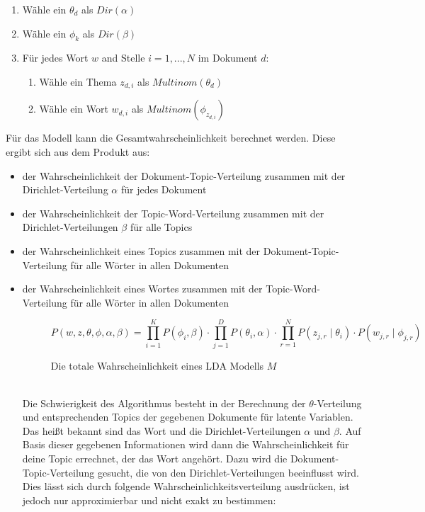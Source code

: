 \documentclass[german,version-2020-11]{uzl-thesis}
\begin{document}
\begin{enumerate}
	\item Wähle ein $\theta_d$ als $Dir(\alpha)$
	\item Wähle ein $\phi_k$ als $Dir(\beta)$
	\item Für jedes Wort $w$ and Stelle $i = 1,...,N$ im Dokument $d$: 
	\begin{enumerate}
		\item Wähle ein Thema $z_{d,i}$ als $Multinom(\theta_d)$
		\item Wähle ein Wort $w_{d,i}$ als $Multinom(\phi_z_{d,i})$
	\end{enumerate}
\end{enumerate}

Für das Modell kann die Gesamtwahrscheinlichkeit berechnet werden. Diese ergibt sich aus dem Produkt aus: 
\begin{itemize}
\item der Wahrscheinlichkeit der Dokument-Topic-Verteilung zusammen mit der Dirichlet-Verteilung $\alpha$ für jedes Dokument
\item der Wahrscheinlichkeit der Topic-Word-Verteilung zusammen mit der Dirichlet-Verteilungen $\beta$ für alle Topics
\item der Wahrscheinlichkeit eines Topics zusammen mit der Dokument-Topic-Verteilung für alle Wörter in allen Dokumenten
\item der Wahrscheinlichkeit eines Wortes zusammen mit der Topic-Word-Verteilung für alle Wörter in allen Dokumenten\\

\begin{figure}[h]
\begin{center}
\begin{equation}
P(w,z,\theta, \phi, \alpha, \beta) = \prod_{i=1}^{K} P(\phi_i, \beta) \cdot \prod_{j=1}^{D}P(\theta_i, \alpha) \cdot \prod_{r=1}^{N} P(z_{j,r}\mid\theta_i) \cdot P(w_{j,r} \mid \phi_{j,r}) 
\end{equation}
\end{center}
\caption{Die totale Wahrscheinlichkeit eines LDA Modells $M$}
\label{fig:equ1}
\end{figure}
\\


Die Schwierigkeit des Algorithmus besteht in der Berechnung der $\theta$-Verteilung und entsprechenden Topics der gegebenen Dokumente für latente Variablen. Das heißt bekannt sind das Wort und die Dirichlet-Verteilungen $\alpha$ und $\beta$. Auf Basis dieser gegebenen Informationen wird dann die Wahrscheinlichkeit für deine Topic errechnet, der das Wort angehört. Dazu wird die Dokument-Topic-Verteilung gesucht, die von den Dirichlet-Verteilungen beeinflusst wird. Dies lässt sich durch folgende Wahrscheinlichkeitsverteilung ausdrücken, ist jedoch nur approximierbar und nicht exakt zu bestimmen: \\


\end{itemize}
\end{document}
